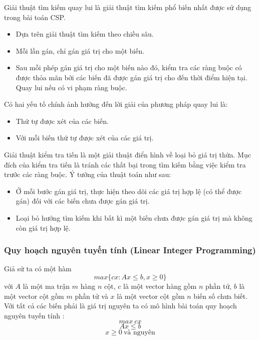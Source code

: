 \documentclass[a4paper,12pt]{report}
\begin{document}
Giải thuật tìm kiếm quay lui là giải thuật tìm kiếm phổ biến nhất được sử dụng trong bài toán CSP. 
\begin{itemize}
\item Dựa trên giải thuật tìm kiếm theo chiều sâu.
\item Mỗi lần gán, chỉ gán giá trị cho một biến.
\item Sau mỗi phép gán giá trị cho một biến nào đó, kiểm tra các ràng buộc có được thỏa mãn bởi các biến đã được gán giá trị cho đến thời điểm hiện tại. Quay lui nếu có vi phạm ràng buộc. 
\end{itemize}
Có hai yếu tố chính ảnh hưởng đến lời giải của phương pháp quay lui là:
\begin{itemize}
\item Thứ tự được xét của các biến.
\item Với mỗi biến thứ tự được xét của các giá trị.

\end{itemize}

Giải thuật kiểm tra tiến là một giải thuật điển hình về loại bỏ giá trị thừa. Mục đích của kiểm tra tiến là tránh các thất bại trong tìm kiếm bằng việc kiểm tra trước các ràng buộc. Ý tưởng của thuật toán như sau:
\begin{itemize}
\item Ở mỗi bước gán giá trị, thực hiện theo dõi các giá trị hợp lệ (có thể được gán) đối với các biến chưa được gán giá trị. 
\item Loại bỏ hướng tìm kiếm khi bất kì một biến chưa được gán giá trị mà không còn giá trị hợp lệ.
\end{itemize}

\subsubsection{Quy hoạch nguyên tuyến tính (Linear Integer Programming)}
Giả sử ta có một hàm $$max\{cx : Ax \leq b, x \geq 0\}$$ với $A$ là một ma trận $m$ hàng $n$ cột, $c$ là một vector hàng gồm $n$ phần tử, $b$ là một vector cột gồm $m$ phần tử và $x$ là một vector cột gồm $n$ biến số chưa biết.\\

 Với tất cả các biến phải là giá trị nguyên ta có mô hình bài toán quy hoạch nguyên tuyến tính\cite{IP} :
$$max \ cx$$
$$Ax \leq b$$
$$x \geq 0 \ \text{và nguyên}$$
\end{document}
